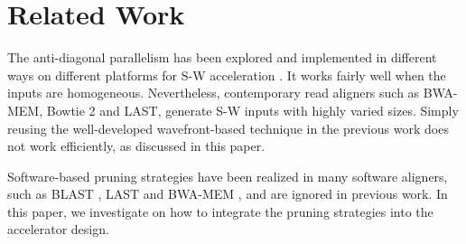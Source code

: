 \section{Related Work} 
\label{sec:related_work}
The anti-diagonal parallelism has been explored and implemented in different ways on different platforms for S-W acceleration \cite{Preusser2012}\cite{RaceLogic}\cite{Zhang2007}\cite{Kim2011}\cite{Lam2013}. 
It works fairly well when the inputs are homogeneous. 
Nevertheless, contemporary read aligners such as BWA-MEM, Bowtie 2 and LAST, generate S-W inputs with highly varied sizes. 
Simply reusing the well-developed wavefront-based technique in the previous work does not work efficiently, as discussed in this paper.

Software-based pruning strategies have been realized in many software aligners, such as BLAST \cite{BLAST1990}, LAST \cite{LAST} and BWA-MEM \cite{BWA-MEM}, and are ignored in previous work. In this paper, we investigate on how to integrate the pruning strategies into the accelerator design.
